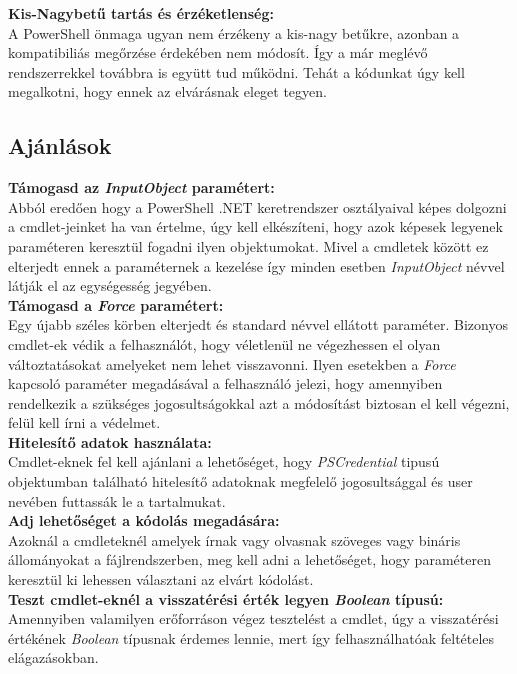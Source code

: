 \documentclass[12pt,oneside,justify,table]{book}
\begin{document}
\noindent \textbf{Kis-Nagybetű tartás és érzéketlenség:}\\
A PowerShell önmaga ugyan nem érzékeny a kis-nagy betűkre, azonban a kompatibiliás megőrzése érdekében nem módosít. Így a már meglévő rendszerrekkel továbbra is együtt tud működni. Tehát a kódunkat úgy kell megalkotni, hogy ennek az elvárásnak eleget tegyen.

\subsection{Ajánlások}
\noindent \textbf{Támogasd az \textit{InputObject} paramétert:}\\
Abból eredően hogy a PowerShell .NET keretrendszer osztályaival képes dolgozni a cmdlet-jeinket ha van értelme, úgy kell elkészíteni, hogy azok képesek legyenek paraméteren keresztül fogadni ilyen objektumokat. Mivel a cmdletek között ez elterjedt ennek a paraméternek a kezelése így minden esetben \textit{InputObject} névvel látják el az egységesség jegyében. \\

\noindent \textbf{Támogasd a \textit{Force} paramétert:} \\
Egy újabb széles körben elterjedt és standard névvel ellátott paraméter. Bizonyos cmdlet-ek védik a felhasználót, hogy véletlenül ne végezhessen el olyan változtatásokat amelyeket nem lehet visszavonni. Ilyen esetekben a \textit{Force} kapcsoló paraméter megadásával a felhasználó jelezi, hogy amennyiben rendelkezik a szükséges jogosultságokkal azt a módosítást biztosan el kell végezni, felül kell írni a védelmet. \\

\noindent \textbf{Hitelesítő adatok használata:} \\
Cmdlet-eknek fel kell ajánlani a lehetőséget, hogy \textit{PSCredential} tipusú objektumban található hitelesítő adatoknak megfelelő jogosultsággal és user nevében futtassák le a tartalmukat. \\

\noindent \textbf{Adj lehetőséget a kódolás megadására:} \\
Azoknál a cmdleteknél amelyek írnak vagy olvasnak szöveges vagy bináris állományokat a fájlrendszerben, meg kell adni a lehetőséget, hogy paraméteren keresztül ki lehessen választani az elvárt kódolást. \\

\noindent \textbf{Teszt cmdlet-eknél a visszatérési érték legyen \textit{Boolean} típusú:} \\
Amennyiben valamilyen erőforráson végez tesztelést a cmdlet, úgy a visszatérési értékének \textit{Boolean} típusnak érdemes lennie, mert így felhasználhatóak feltételes elágazásokban. \\
\end{document}

